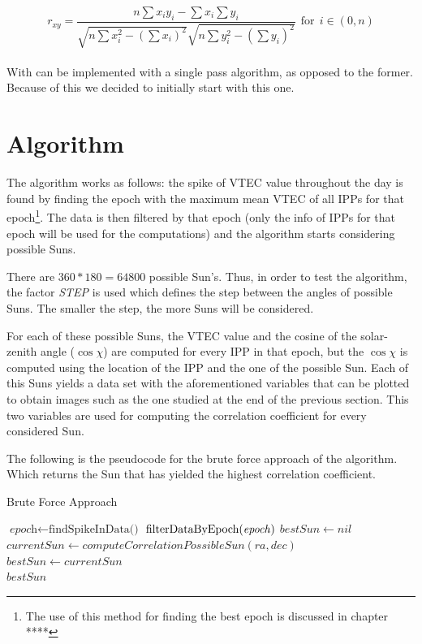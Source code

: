 \begin{equation} \label{eq:singlePass}
r_{xy} = \frac{n\sum x_{i}y_{i} - \sum x_{i}\sum y_{i}}
{\sqrt{n\sum x_{i}^{2} - (\sum x_{i})^{2}}
	\sqrt{n\sum y_{i}^{2} - (\sum y_{i})^{2}}}  \ \ \text{for} \ \ i \in (0, n)
\end{equation} \\

With can be implemented with a single pass algorithm, as opposed to the former. Because of this we decided to initially start with this one.

\section{Algorithm}

The algorithm works as follows: the spike of VTEC value throughout the day is found by finding the epoch with the maximum mean VTEC of all IPPs for that epoch\footnote{The use of this method for finding the best epoch is discussed in chapter **** }.
The data is then filtered by that epoch (only the info of IPPs for that epoch will be used for the computations) and the algorithm starts considering possible Suns.

There are $360 * 180 = 64800$ possible Sun's. Thus, in order to test the algorithm, the factor \textit{STEP} is used which defines the step between the angles of possible Suns. The smaller the step, the more Suns will be considered. 

For each of these possible Suns, the VTEC value and the cosine of the solar-zenith angle ($\cos \chi$) are computed for every IPP in that epoch, but the $\cos \chi$ is computed using the location of the IPP and the one of the possible Sun. Each of this Suns yields a data set with the aforementioned variables that can be plotted to obtain images such as the one studied at the end of the previous section. This two variables are used for computing the correlation coefficient for every considered Sun.

The following is the pseudocode for the brute force approach of the algorithm. Which returns the Sun that has yielded the highest correlation coefficient.

\begin{algorithm}
	\caption{Brute Force Approach}\label{pseudocodeBruteForce}
	\begin{algorithmic}[1]
		\State $\textit{epoch} \gets \text{findSpikeInData()}$ 
		\State $\text{filterDataByEpoch(\textit{epoch})}$
		\State $bestSun \gets nil$
		\State $currentSun \gets computeCorrelationPossibleSun(ra, dec)$
		\State $bestSun \gets currentSun$
		\EndIf
		\EndFor
		\EndFor
		\\
		\Return $bestSun$
		\EndProcedure
	\end{algorithmic}
\end{algorithm}

